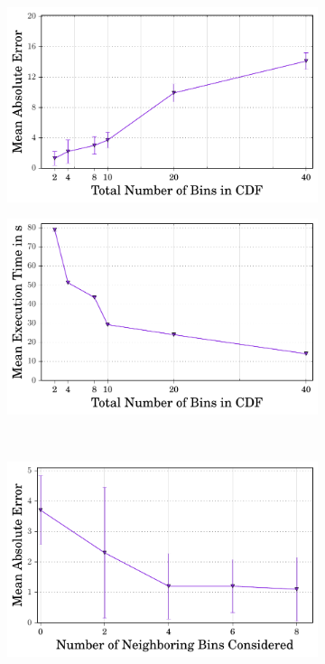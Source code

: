 \begin{figure}[ht]
\begin{subfigure}[b]{0.45\linewidth}
        \label{fig:time:}
        \end{subfigure}
        \\
         \begin{subfigure}[b]{0.45\linewidth}
    \centering \includegraphics[width=1\linewidth]{index_numberOfBins_error.pdf}
        \caption{}
        \label{fig:error:NumberOfBins}\end{subfigure}
        \begin{subfigure}[b]{0.45\linewidth}
        \includegraphics[width=1\linewidth]{index_numberOfBins_time.pdf}
        \caption{}
        \label{fig:time:NumberOfBins}
        \end{subfigure}
        \\  
        \begin{subfigure}[b]{0.45\linewidth}
    \centering \includegraphics[width=1\linewidth]{index_NeighboringBins_error.pdf}

\end{subfigure}
\end{figure}
